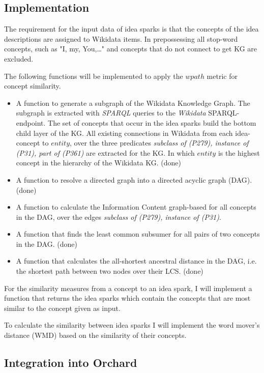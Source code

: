 \documentclass[pdftex,a4paper,12pt]{scrartcl}
\theoremstyle{definition}
\begin{document}
    \subsection{Implementation}
    
    The requirement for the input data of idea sparks is that the concepts of the idea descriptions are assigned to Wikidata items. In prepossessing all stop-word concepts, such as "I, my, You,\dots" and concepts that do not connect to get KG are excluded.
    
    The following functions will be implemented to apply the $wpath$ metric for concept similarity.
    \begin{itemize}
        \item A function to generate a subgraph of the Wikidata Knowledge Graph.
        The subgraph is extracted with \textit{SPARQL} queries to the \textit{Wikidata} SPARQL-endpoint. The set of concepts that occur in the idea sparks build the bottom child layer of the KG. All existing connections in Wikidata from each idea-concept to $entity$, over the three predicates \textit{subclass of (P279), instance of (P31), part of (P361)} are extracted for the KG. In which $entity$ is the highest concept in the hierarchy of the Wikidata KG. (done)
        \item A function to resolve a directed graph into a directed acyclic graph (DAG). (done)
        \item A function to calculate the Information Content graph-based for all concepts in the DAG, over the edges \textit{subclass of (P279), instance of (P31)}. 
        \item A function that finds the least common subsumer for all pairs of two concepts in the DAG. (done)
        \item A function that calculates the all-shortest ancestral distance in the DAG, i.e. the shortest path between two nodes over their LCS. (done)
    \end{itemize}
    
    For the similarity measures from a concept to an idea spark, I will implement a function that returns the idea sparks which contain the concepts that are most similar to the concept given as input. 
    
    To calculate the similarity between idea sparks I will implement the word mover's distance (WMD) \citep{kusner_word_nodate} based on the similarity of their concepts. 
    
    \subsection{Integration into Orchard}
    
\end{document}
